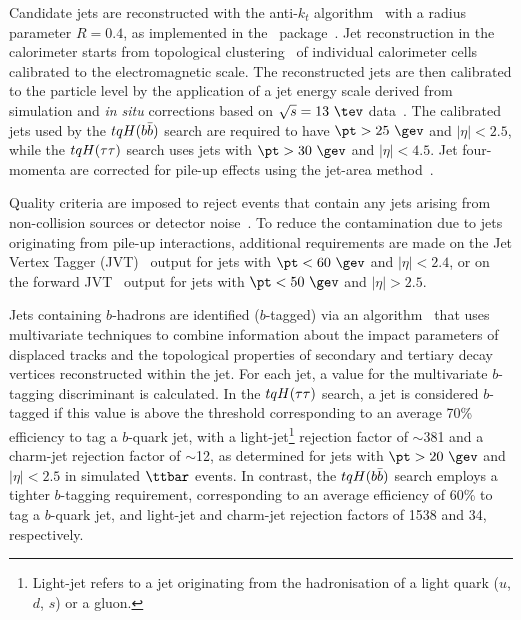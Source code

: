 Candidate jets are reconstructed with the anti-$k_t$ algorithm~\cite{Cacciari:2008gp,Cacciari:2005hq} with a
radius parameter $R=0.4$, as implemented in the \fastjet\ package~\cite{Cacciari:2011ma}.  
Jet reconstruction in the calorimeter starts from topological clustering~\cite{Aad:2016upy} of individual calorimeter cells calibrated to the electromagnetic scale. 
The reconstructed jets are then calibrated to the particle level by the application of a jet energy scale 
derived from simulation and {\textit{in situ}} corrections based on $\sqrt{s}=13~\tev$ data~\cite{Aaboud:2017jcu}.
The calibrated jets used by the $tqH(b\bar{b})$ search are required to have $\pt > 25~\gev$ and $|\eta| < 2.5$,
while the $tqH(\tau\tau)$ search uses jets with $\pt > 30~\gev$ and $|\eta| < 4.5$.
Jet four-momenta are corrected for pile-up effects using the jet-area method~\cite{Cacciari:2008gn}.

Quality criteria are imposed to reject events that contain any jets arising from non-collision sources
or detector noise~\cite{ATLAS-CONF-2015-029}.  To reduce the contamination due to jets originating from pile-up interactions,
additional requirements are made on the Jet Vertex Tagger (JVT)~\cite{Aad:2015ina} output for jets with $\pt<60~\gev$ and $|\eta| < 2.4$,
or on the forward JVT~\cite{Aaboud:2017pou} output for jets with $\pt<50~\gev$ and $|\eta| > 2.5$.

Jets containing $b$-hadrons are identified ($b$-tagged) via an algorithm~\cite{Aad:2015ydr,ATL-PHYS-PUB-2016-012} 
that uses multivariate techniques to combine information about the impact parameters of displaced tracks and the  topological properties 
of secondary and tertiary decay vertices reconstructed within the jet. For each jet, a value for the multivariate $b$-tagging discriminant is 
calculated. In the $tqH(\tau\tau)$ search, a jet is considered $b$-tagged if this value is above the threshold corresponding to
an average 70\% efficiency to tag a $b$-quark jet, with a light-jet\footnote{Light-jet refers to a jet originating from the hadronisation of a light quark 
($u$, $d$, $s$) or a gluon.} rejection factor of $\sim$381 and a charm-jet rejection factor of $\sim$12, as determined for jets with
$\pt >20~\gev$ and $|\eta|<2.5$ in simulated $\ttbar$ events. In contrast, the $tqH(b\bar{b})$ search employs a tighter $b$-tagging requirement, 
corresponding to an average efficiency of 60\% to tag a $b$-quark jet, and light-jet and charm-jet rejection factors of 1538 and 34, respectively.

